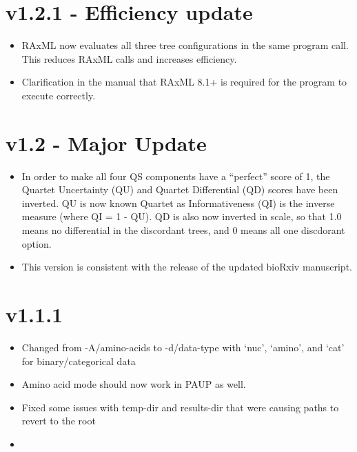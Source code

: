 \documentclass[letterpaper,12pt,english]{sphinxmanual}
\begin{document}
\section{v1.2.1 - Efficiency update}
\label{\detokenize{releases:v1-2-1-efficiency-update}}\begin{itemize}
\item {} 
RAxML now evaluates all three tree configurations in the same program call.  This reduces RAxML calls and increases efficiency.

\item {} 
Clarification in the manual that RAxML 8.1+ is required for the program to execute correctly.

\end{itemize}


\section{v1.2 - Major Update}
\label{\detokenize{releases:v1-2-major-update}}\begin{itemize}
\item {} 
In order to make all four QS components have a “perfect” score of 1, the Quartet Uncertainty (QU) and Quartet Differential (QD) scores have been inverted. QU is now known Quartet as Informativeness (QI) is the inverse measure (where QI = 1 - QU).  QD is also now inverted in scale, so that 1.0 means no differential in the discordant trees, and 0 means all one discdorant option.

\item {} 
This version is consistent with the release of the updated bioRxiv manuscript.

\end{itemize}


\section{v1.1.1}
\label{\detokenize{releases:v1-1-1}}\begin{itemize}
\item {} 
Changed from -A/\textendash{}amino-acids to -d/\textendash{}data-type with ‘nuc’, ‘amino’, and ‘cat’ for binary/categorical data

\item {} 
Amino acid mode should now work in PAUP as well.

\item {} 
Fixed some issues with temp-dir and results-dir that were causing paths to revert to the root

\item {} 

\end{itemize}
\end{document}
